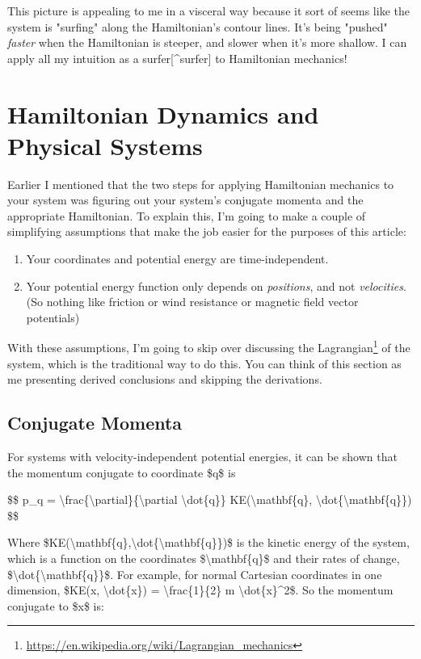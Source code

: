 \documentclass[]{article}
\renewcommand{\href}[2]{#2\footnote{\url{#1}}}
\begin{document}
This picture is appealing to me in a visceral way because it sort of seems like
the system is "surfing" along the Hamiltonian's contour lines. It's being
"pushed" \emph{faster} when the Hamiltonian is steeper, and slower when it's
more shallow. I can apply all my intuition as a surfer{[}\^{}surfer{]} to
Hamiltonian mechanics!

\section{Hamiltonian Dynamics and Physical Systems}

Earlier I mentioned that the two steps for applying Hamiltonian mechanics to
your system was figuring out your system's conjugate momenta and the appropriate
Hamiltonian. To explain this, I'm going to make a couple of simplifying
assumptions that make the job easier for the purposes of this article:

\begin{enumerate}
\tightlist
\item
  Your coordinates and potential energy are time-independent.
\item
  Your potential energy function only depends on \emph{positions}, and not
  \emph{velocities}. (So nothing like friction or wind resistance or magnetic
  field vector potentials)
\end{enumerate}

With these assumptions, I'm going to skip over discussing the
\href{https://en.wikipedia.org/wiki/Lagrangian_mechanics}{Lagrangian} of the
system, which is the traditional way to do this. You can think of this section
as me presenting derived conclusions and skipping the derivations.

\subsection{Conjugate Momenta}

For systems with velocity-independent potential energies, it can be shown that
the momentum conjugate to coordinate \$q\$ is

\$\$ p\_q =
\textbackslash{}frac\{\textbackslash{}partial\}\{\textbackslash{}partial
\textbackslash{}dot\{q\}\} KE(\textbackslash{}mathbf\{q\},
\textbackslash{}dot\{\textbackslash{}mathbf\{q\}\}) \$\$

Where
\$KE(\textbackslash{}mathbf\{q\},\textbackslash{}dot\{\textbackslash{}mathbf\{q\}\})\$
is the kinetic energy of the system, which is a function on the coordinates
\$\textbackslash{}mathbf\{q\}\$ and their rates of change,
\$\textbackslash{}dot\{\textbackslash{}mathbf\{q\}\}\$. For example, for normal
Cartesian coordinates in one dimension, \$KE(x, \textbackslash{}dot\{x\}) =
\textbackslash{}frac\{1\}\{2\} m \textbackslash{}dot\{x\}\^{}2\$. So the
momentum conjugate to \$x\$ is:
\end{document}
